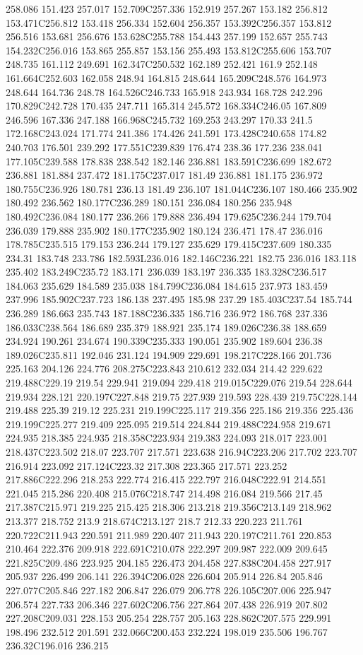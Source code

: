 258.086 151.423 257.017 152.709C257.336 152.919 257.267 153.182 256.812 153.471C256.812 153.418 256.334 152.604 256.357 153.392C256.357 153.812 256.516 153.681 256.676 153.628C255.788 154.443 257.199 152.657 255.743 154.232C256.016 153.865 255.857 153.156 255.493 153.812C255.606 153.707 248.735 161.112 249.691 162.347C250.532 162.189 252.421 161.9 252.148 161.664C252.603 162.058 248.94 164.815 248.644 165.209C248.576 164.973 248.644 164.736 248.78 164.526C246.733 165.918 243.934 168.728 242.296 170.829C242.728 170.435 247.711 165.314 245.572 168.334C246.05 167.809 246.596 167.336 247.188 166.968C245.732 169.253 243.297 170.33 241.5 172.168C243.024 171.774 241.386 174.426 241.591 173.428C240.658 174.82 240.703 176.501 239.292 177.551C239.839 176.474 238.36 177.236 238.041 177.105C239.588 178.838 238.542 182.146 236.881 183.591C236.699 182.672 236.881 181.884 237.472 181.175C237.017 181.49 236.881 181.175 236.972 180.755C236.926 180.781 236.13 181.49 236.107 181.044C236.107 180.466 235.902 180.492 236.562 180.177C236.289 180.151 236.084 180.256 235.948 180.492C236.084 180.177 236.266 179.888 236.494 179.625C236.244 179.704 236.039 179.888 235.902 180.177C235.902 180.124 236.471 178.47 236.016 178.785C235.515 179.153 236.244 179.127 235.629 179.415C237.609 180.335 234.31 183.748 233.786 182.593L236.016 182.146C236.221 182.75 236.016 183.118 235.402 183.249C235.72 183.171 236.039 183.197 236.335 183.328C236.517 184.063 235.629 184.589 235.038 184.799C236.084 184.615 237.973 183.459 237.996 185.902C237.723 186.138 237.495 185.98 237.29 185.403C237.54 185.744 236.289 186.663 235.743 187.188C236.335 186.716 236.972 186.768 237.336 186.033C238.564 186.689 235.379 188.921 235.174 189.026C236.38 188.659 234.924 190.261 234.674 190.339C235.333 190.051 235.902 189.604 236.38 189.026C235.811 192.046 231.124 194.909 229.691 198.217C228.166 201.736 225.163 204.126 224.776 208.275C223.843 210.612 232.034 214.42 229.622 219.488C229.19 219.54 229.941 219.094 229.418 219.015C229.076 219.54 228.644 219.934 228.121 220.197C227.848 219.75 227.939 219.593 228.439 219.75C228.144 219.488 225.39 219.12 225.231 219.199C225.117 219.356 225.186 219.356 225.436 219.199C225.277 219.409 225.095 219.514 224.844 219.488C224.958 219.671 224.935 218.385 224.935 218.358C223.934 219.383 224.093 218.017 223.001 218.437C223.502 218.07 223.707 217.571 223.638 216.94C223.206 217.702 223.707 216.914 223.092 217.124C223.32 217.308 223.365 217.571 223.252 217.886C222.296 218.253 222.774 216.415 222.797 216.048C222.91 214.551 221.045 215.286 220.408 215.076C218.747 214.498 216.084 219.566 217.45 217.387C215.971 219.225 215.425 218.306 213.218 219.356C213.149 218.962 213.377 218.752 213.9 218.674C213.127 218.7 212.33 220.223 211.761 220.722C211.943 220.591 211.989 220.407 211.943 220.197C211.761 220.853 210.464 222.376 209.918 222.691C210.078 222.297 209.987 222.009 209.645 221.825C209.486 223.925 204.185 226.473 204.458 227.838C204.458 227.917 205.937 226.499 206.141 226.394C206.028 226.604 205.914 226.84 205.846 227.077C205.846 227.182 206.847 226.079 206.778 226.105C207.006 225.947 206.574 227.733 206.346 227.602C206.756 227.864 207.438 226.919 207.802 227.208C209.031 228.153 205.254 228.757 205.163 228.862C207.575 229.991 198.496 232.512 201.591 232.066C200.453 232.224 198.019 235.506 196.767 236.32C196.016 236.215 
